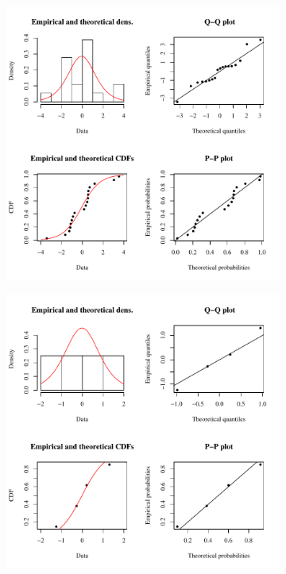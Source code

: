 \begin{linenumbers}
\subfiguremid
\begin{landscape}
	\begin{figure}
		\begin{subfigure}{0.7\textwidth}
			\centering
			\includegraphics[width=\tableCustomSize]{"Figures/Results_USR/Stochastic/Conc Model res-fit TIM"}
		\end{subfigure}%
		\begin{subfigure}{0.7\textwidth}
			\centering
			\includegraphics[width=\tableCustomSize]{"Figures/Results_USR/Stochastic/Conc Model res-fit HRC"}

\end{subfigure}
\end{figure}
\end{landscape}
\end{linenumbers}
